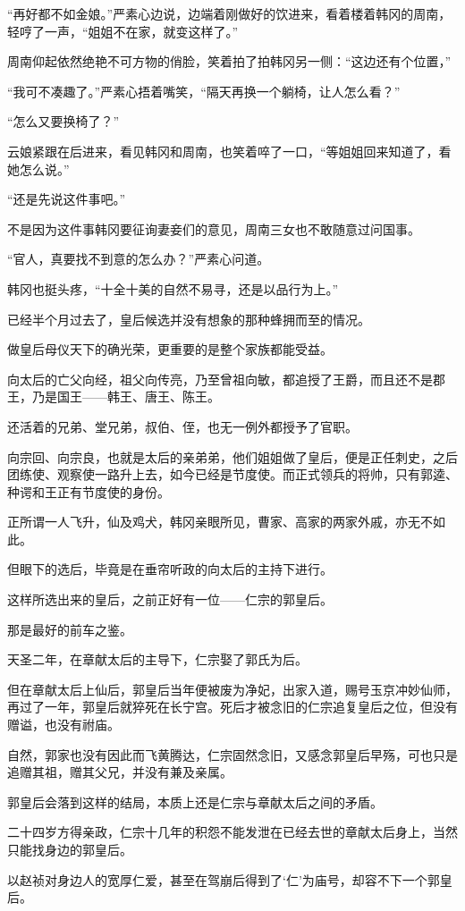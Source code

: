 “再好都不如金娘。”严素心边说，边端着刚做好的饮进来，看着楼着韩冈的周南，轻哼了一声，“姐姐不在家，就变这样了。”

周南仰起依然绝艳不可方物的俏脸，笑着拍了拍韩冈另一侧：“这边还有个位置，”

“我可不凑趣了。”严素心捂着嘴笑，“隔天再换一个躺椅，让人怎么看？”

“怎么又要换椅了？”

云娘紧跟在后进来，看见韩冈和周南，也笑着啐了一口，“等姐姐回来知道了，看她怎么说。”

“还是先说这件事吧。”

不是因为这件事韩冈要征询妻妾们的意见，周南三女也不敢随意过问国事。

“官人，真要找不到意的怎么办？”严素心问道。

韩冈也挺头疼，“十全十美的自然不易寻，还是以品行为上。”

已经半个月过去了，皇后候选并没有想象的那种蜂拥而至的情况。

做皇后母仪天下的确光荣，更重要的是整个家族都能受益。

向太后的亡父向经，祖父向传亮，乃至曾祖向敏，都追授了王爵，而且还不是郡王，乃是国王——韩王、唐王、陈王。

还活着的兄弟、堂兄弟，叔伯、侄，也无一例外都授予了官职。

向宗回、向宗良，也就是太后的亲弟弟，他们姐姐做了皇后，便是正任刺史，之后团练使、观察使一路升上去，如今已经是节度使。而正式领兵的将帅，只有郭逵、种谔和王正有节度使的身份。

正所谓一人飞升，仙及鸡犬，韩冈亲眼所见，曹家、高家的两家外戚，亦无不如此。

但眼下的选后，毕竟是在垂帘听政的向太后的主持下进行。

这样所选出来的皇后，之前正好有一位——仁宗的郭皇后。

那是最好的前车之鉴。

天圣二年，在章献太后的主导下，仁宗娶了郭氏为后。

但在章献太后上仙后，郭皇后当年便被废为净妃，出家入道，赐号玉京冲妙仙师，再过了一年，郭皇后就猝死在长宁宫。死后才被念旧的仁宗追复皇后之位，但没有赠谥，也没有祔庙。

自然，郭家也没有因此而飞黄腾达，仁宗固然念旧，又感念郭皇后早殇，可也只是追赠其祖，赠其父兄，并没有兼及亲属。

郭皇后会落到这样的结局，本质上还是仁宗与章献太后之间的矛盾。

二十四岁方得亲政，仁宗十几年的积怨不能发泄在已经去世的章献太后身上，当然只能找身边的郭皇后。

以赵祯对身边人的宽厚仁爱，甚至在驾崩后得到了‘仁’为庙号，却容不下一个郭皇后。

